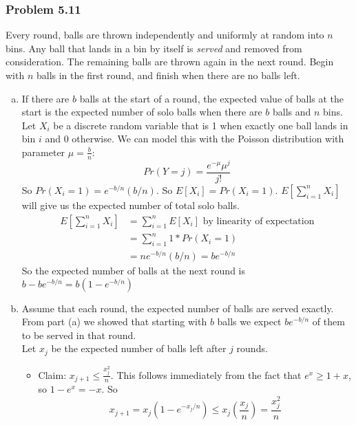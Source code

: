 \documentclass[12pt,letterpaper]{article}
\newenvironment{answer}[1]{
  \subsubsection*{Problem #1}
}{\newpage}
\begin{document}
\begin{answer}{5.11}
Every round, balls are thrown independently and uniformly at random into $n$ bins. Any ball that lands in a bin by itself is \emph{served} and removed from consideration. The remaining balls are thrown again in the next round. Begin with $n$ balls in the first round, and finish when there are no balls left.
\begin{enumerate}[(a)]
	\item If there are $b$ balls at the start of a round, the expected value of balls at the start is the expected number of solo balls when there are $b$ balls and $n$ bins. Let $X_i$ be a discrete random variable that is 1 when exactly one ball lands in bin $i$ and 0 otherwise. We can model this with the Poisson distribution with parameter $\mu = \frac{b}{n}$:
		$$Pr(Y = j) = \frac{e^{-\mu}\mu^j}{j!}$$
		So $Pr(X_i = 1) = e^{-b/n}(b/n)$. So $E[X_i] = Pr(X_i = 1)$. $E\left[\sum_{i=1}^n X_i\right]$ will give us the expected number of total solo balls.
		\begin{align*}
		E\left[\sum_{i=1}^n X_i\right] &= \sum_{i=1}^n E[X_i] \text{ by linearity of expectation}\\
			&= \sum_{i=1}^n 1 * Pr(X_i = 1) \\
			&= ne^{-b/n}(b/n) = be^{-b/n}
		\end{align*}
	So the expected number of balls at the next round is $b - be^{-b/n} = b(1 - e^{-b/n})$
	\item Assume that each round, the expected number of balls are served exactly. From part (a) we showed that starting with $b$ balls we expect $be^{-b/n}$ of them to be served in that round. \\
	Let $x_j$ be the expected number of balls left after $j$ rounds.
	\begin{itemize}
		\item Claim: $x_{j+1} \le \frac{x_j^2}{n}$. This follows immediately from the fact that $e^x \ge 1 + x$, so $1 - e^x = -x$. So
			$$x_{j+1} = x_j(1 - e^{-x_j / n}) \le x_j(\frac{x_j}{n}) = \frac{x_j^2}{n}$$


\end{itemize}
\end{enumerate}
\end{answer}
\end{document}
